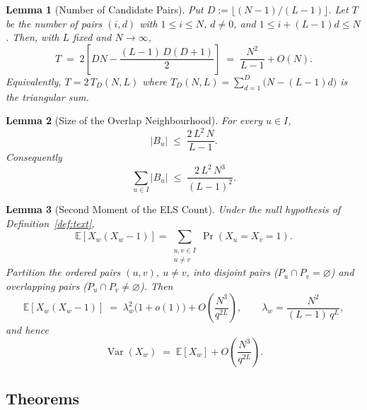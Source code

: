 \documentclass[11pt]{amsart}
\theoremstyle{plain}
\newtheorem{lemma}{Lemma}
\theoremstyle{remark}
\begin{document}
\begin{lemma}[Number of Candidate Pairs]
\label{lem:candidates}
Put \(D := \lfloor (N-1)/(L-1) \rfloor\). Let \(T\) be the number of pairs
\((i,d)\) with \(1 \le i \le N\), \(d \neq 0\), and
\(1 \le i + (L-1)d \le N\). Then, with \(L\) fixed and \(N \to \infty\),
\begin{equation}
\label{eq:candidates-exact}
T \;=\; 2\!\left[ DN - \frac{(L-1)\,D(D+1)}{2} \right]
   \;=\; \frac{N^{2}}{L-1} + O(N).
\end{equation}
Equivalently, \(T = 2\,T_{D}(N,L)\) where
\(T_{D}(N,L) = \sum_{d=1}^{D}\bigl(N-(L-1)d\bigr)\) is the triangular sum.
\end{lemma}

\begin{lemma}[Size of the Overlap Neighbourhood]
\label{lem:Bu}
For every \(u\in I\),
\begin{equation}
\label{eq:Bu-bound}
|B_u| \;\le\; \frac{2\,L^{2}\,N}{L-1}.
\end{equation}
Consequently
\begin{equation}
\label{eq:sum-Bu}
\sum_{u\in I} |B_u| \;\le\; \frac{2\,L^{2}\,N^{3}}{(L-1)^{2}}.
\end{equation}
\end{lemma}

\begin{lemma}[Second Moment of the ELS Count]
\label{lem:variance}
Under the null hypothesis of Definition~\ref{def:text},
\begin{equation}
\label{eq:second-moment}
\mathbb{E}[X_w(X_w-1)]
  = \sum_{\substack{u,v\in I\\ u\neq v}} \Pr(X_u = X_v = 1).
\end{equation}
Partition the ordered pairs \((u,v)\), \(u\neq v\), into
\emph{disjoint} pairs (\(P_u\cap P_v=\varnothing\)) and
\emph{overlapping} pairs (\(P_u\cap P_v\neq\varnothing\)).
Then
\begin{equation}
\label{eq:aperiodic-cov}
\mathbb{E}[X_w(X_w-1)]
   \;=\; \lambda_w^{2}\bigl(1 + o(1)\bigr) + O\!\left(\frac{N^{3}}{q^{2L}}\right),
\qquad
\lambda_w = \frac{N^{2}}{(L-1)\,q^{L}},
\end{equation}
and hence
\begin{equation}
\label{eq:variance}
\operatorname{Var}(X_w)
   \;=\; \mathbb{E}[X_w] + O\!\left(\frac{N^{3}}{q^{2L}}\right).
\end{equation}
\end{lemma}

\subsection{Theorems}
\end{document}

